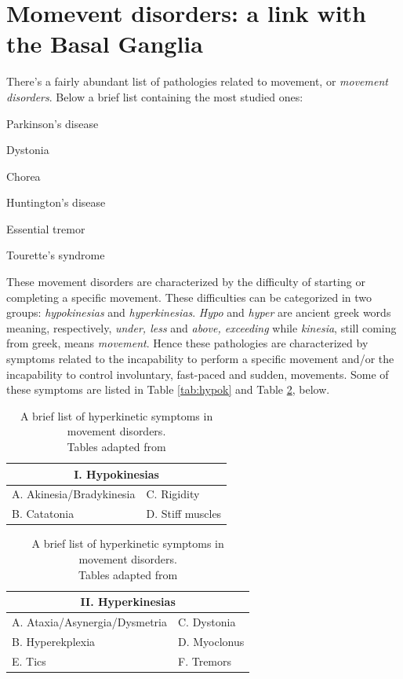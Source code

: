 \documentclass[MSc,english]{Container/thesistemplate}
\begin{document}
\newpage
\section{Momevent disorders: a link with the Basal Ganglia}
There's a fairly abundant list of pathologies related to movement, or \emph{movement disorders}.  Below a brief list containing the most studied ones:

\begin{itemize}
\begin{multicols}{2}
	\item Parkinson's disease
	\item Dystonia
	\item Chorea
	\item Huntington's disease
	\item Essential tremor
	\item Tourette's syndrome
\end{multicols}
\end{itemize}

These movement disorders are characterized by the difficulty of starting or completing a specific movement. These difficulties can be categorized in two groups: \emph{hypokinesias} and \emph{hyperkinesias}. \emph{Hypo} and \emph{hyper} are ancient greek words meaning, respectively,  \emph{under, less} and \emph{above, exceeding} while \emph{kinesia}, still coming from greek, means \emph{movement}. Hence these pathologies are characterized by symptoms related to the incapability to perform a specific movement and/or the incapability to control involuntary, fast-paced and sudden, movements.
Some of these symptoms are listed in Table \ref{tab:hypok} and Table \ref{tab:hyperk}, below.

\begin{table}[ht!]
\centering

\begin{tabular}{ll}
\multicolumn{2}{c}{I. Hypokinesias} \\
\hline
A. Akinesia/Bradykinesia & C. Rigidity \\
B. Catatonia &  D. Stiff muscles \\
\hline
\end{tabular}

\caption{A brief list of hypokinetic symptoms in movement disorders. These symptoms limit and drastically slow down the movements that a person tries to do.}
\label{tab:hypok}

\vspace*{.5 cm}

\begin{tabular}{ll}
\multicolumn{2}{c}{II. Hyperkinesias} \\
\hline
A. Ataxia/Asynergia/Dysmetria & C. Dystonia \\
B. Hyperekplexia & D. Myoclonus \\
E. Tics & F. Tremors \\
\hline
\end{tabular}

\caption{A brief list of hyperkinetic symptoms in movement disorders. \\ Tables adapted from \cite{fahn}}
\label{tab:hyperk}
\end{table}
\end{document}
